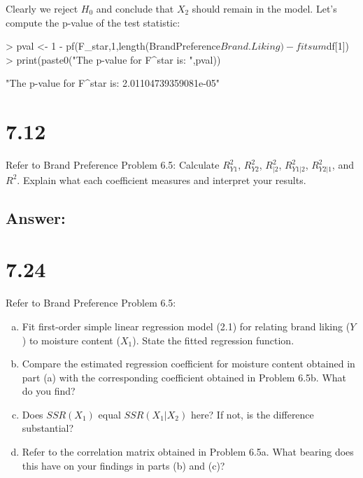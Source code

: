 \documentclass{article}
\begin{document}
\begin{enumerate}[a)]
Clearly we reject $H_0$ and conclude that $X_2$ should remain in the model. Let's compute the p-value of the test statistic:

\begin{Schunk}
\begin{Sinput}
> pval <- 1 - pf(F_star,1,length(BrandPreference$Brand.Liking)-fitsum$df[1])
> print(paste0("The p-value for F^star is: ",pval))
\end{Sinput}
\begin{Soutput}
[1] "The p-value for F^star is: 2.01104739359081e-05"
\end{Soutput}
\end{Schunk}

\end{enumerate}

\section{7.12}

Refer to Brand Preference Problem 6.5: Calculate $R_{Y1}^2$, $R_{Y2}^2$, $R_{|2}^2$, $R_{Y1|2}^2$, $R_{Y2|1}^2$, and $R^2$. Explain what each coefficient measures and interpret your results.

\subsection{Answer:}

\section{7.24}

Refer to Brand Preference Problem 6.5:

\begin{enumerate}[a)]
\item{} Fit first-order simple linear regression model (2.1) for relating brand liking ($Y$) to moisture content ($X_1$). State the fitted regression function.
\item{} Compare the estimated regression coefficient for moisture content obtained in part (a) with the corresponding coefficient obtained in Problem 6.5b. What do you find?
\item{} Does $SSR(X_1)$ equal $SSR(X_1|X_2)$ here? If not, is the difference substantial?
\item{} Refer to the correlation matrix obtained in Problem 6.5a. What bearing does this have on your findings in parts (b) and (c)?
\end{enumerate}
\end{document}

